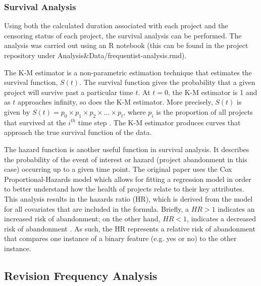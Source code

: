 \documentclass[acmconf]{acmart}
\begin{document}
\subsubsection{Survival Analysis}
Using both the calculated duration associated with each project and the censoring status of each project, the survival analysis can be performed.
The analysis was carried out using an R notebook (this can be found in the project repository under Analysis\&Data/frequentist-analysis.rmd).

The K-M estimator is a non-parametric estimation technique that estimates the survival function, $S(t)$.
The survival function gives the probability that a given project will survive past a particular time $t$.
At $t = 0$, the K-M estimator is 1 and as $t$ approaches infinity, so does the K-M estimator.
More precisely, $S(t)$ is given by  $S(t) = p_0 \times p_1 \times p_2 \times \dots \times p_t$, where $p_i$ is the proportion of all projects that survived at the $i^{th}$ time step \cite{kaplan1958nonparametric}.
The K-M estimator produces curves that approach the true survival function of the data.

The hazard function is another useful function in survival analysis. It describes the probability of the event of interest or hazard (project abandonment in this case) occurring up to a given time point.
The original paper uses the Cox Proportional-Hazards model which allows for fitting a regression model in order to better understand how the health of projects relate to their key attributes. 
This analysis results in the hazards ratio (HR), which is derived from the model for all covariates that are included in the formula. 
Briefly, a $HR > 1$ indicates an increased risk of abandonment; on the other hand, $HR < 1$, indicates a decreased risk of abandonment \cite{cox1972regression}. 
As such, the HR represents a relative risk of abandonment that compares one instance of a binary feature (e.g. yes or no) to the other instance.

\subsection{Revision Frequency Analysis} \label{revisionFreq}
\end{document}
